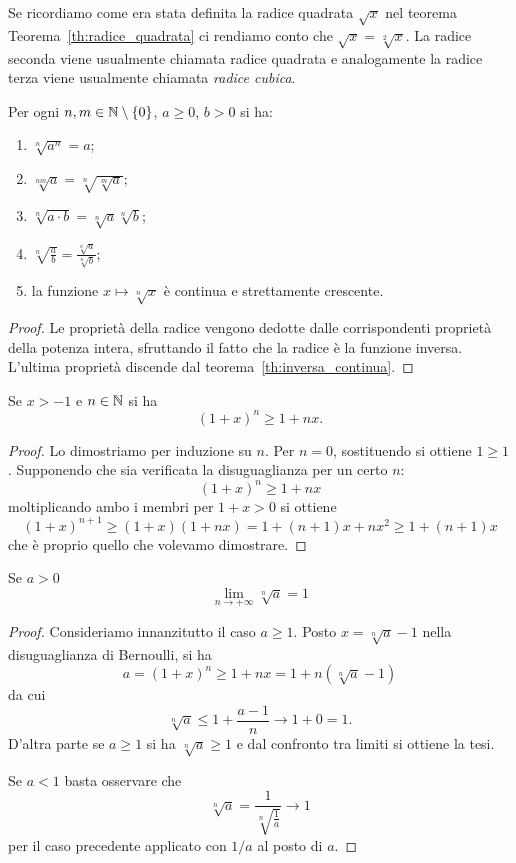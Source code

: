 Se ricordiamo come era stata definita la radice quadrata $\sqrt x$ nel teorema Teorema~\ref{th:radice_quadrata} ci rendiamo conto che $\sqrt {x} = \sqrt[2]{x}$.
La radice seconda viene usualmente chiamata radice quadrata e
analogamente la radice terza viene usualmente chiamata \emph{radice cubica}.

\begin{theorem}
Per ogni $n,m \in \mathbb N\setminus\{0\}$, $a\ge 0$, $b>0$ si ha:
\begin{enumerate}
\item $\sqrt[n]{a^n} = a$;
\item $\displaystyle \sqrt[nm]{a} = \sqrt[n]{\sqrt[m]{a}}$;
\item $\displaystyle \sqrt[n]{a\cdot b} = \sqrt[n]{a}\sqrt[n]{b}$;
\item $\displaystyle \sqrt[n]{\frac a b} = \frac{\sqrt[n]{a}}{\sqrt[n]{b}}$;
\item la funzione $x\mapsto \sqrt[n]{x}$ è continua e strettamente crescente.
\end{enumerate}
\end{theorem}

\begin{proof}
Le proprietà della radice vengono dedotte dalle corrispondenti proprietà
della potenza intera, sfruttando il fatto che la radice è la funzione inversa.
L'ultima proprietà discende dal teorema~\ref{th:inversa_continua}.
\end{proof}

\begin{theorem}
\mymark{**}
Se $x > -1$ e $n\in \mathbb N$ si ha
\[
(1+x)^n \ge 1 + nx.
\]
\end{theorem}
%
\begin{proof}
\mymark{**}
Lo dimostriamo per induzione su $n$. Per $n=0$, sostituendo si ottiene $1\ge 1$.
Supponendo che sia verificata la disuguaglianza per un certo $n$:
\[
(1+x)^n \ge 1 + nx
\]
moltiplicando ambo i membri per $1+x > 0$ si ottiene
\[
(1+x)^{n+1} \ge (1+x) (1+nx) = 1 + (n+1)x + n x^2
\ge 1 + (n+1)x
\]
che è proprio quello che volevamo dimostrare.
\end{proof}

\begin{theorem}
\label{th:limite_radice}
\mymark{**}
Se $a>0$
\[
   \lim_{n\to +\infty} \sqrt[n]{a} = 1
\]
\end{theorem}
%
\begin{proof}
\mymark{*}
Consideriamo innanzitutto il caso $a\ge 1$.
Posto $x=\sqrt[n]{a}-1$ nella disuguaglianza di Bernoulli, si ha
\[
a
= (1+x)^n
\ge 1 + nx
= 1 + n (\sqrt[n]{a}-1)
\]
da cui
\[
 \sqrt[n]{a} \le 1 + \frac{a-1}{n} \to 1 + 0 = 1.
\]
D'altra parte se $a\ge 1$ si ha $\sqrt[n]{a} \ge 1$
e dal confronto tra limiti si ottiene la tesi.

Se $a<1$ basta osservare che
\[
\sqrt[n]{a} = \frac{1}{\sqrt[n]{\frac 1 a}} \to 1
\]
per il caso precedente applicato con $1/a$ al posto di $a$.
\end{proof}

